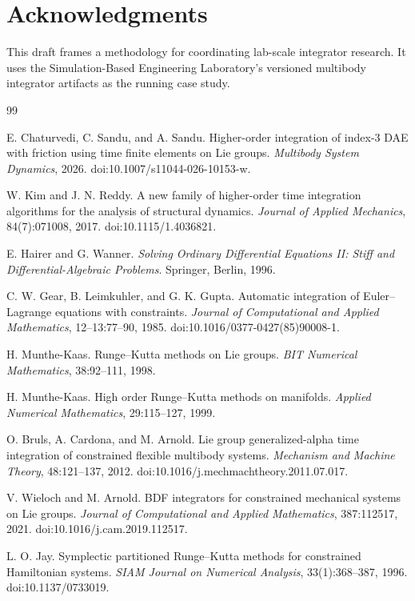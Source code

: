 \documentclass[10pt]{article}
\begin{document}
\section*{Acknowledgments}

This draft frames a methodology for coordinating lab-scale integrator
research. It uses the Simulation-Based Engineering Laboratory's versioned
multibody integrator artifacts as the running case study.

\begin{thebibliography}{99}

E. Chaturvedi, C. Sandu, and A. Sandu.
Higher-order integration of index-3 DAE with friction using time finite
elements on Lie groups.
\emph{Multibody System Dynamics}, 2026.
doi:10.1007/s11044-026-10153-w.

W. Kim and J. N. Reddy.
A new family of higher-order time integration algorithms for the analysis of
structural dynamics.
\emph{Journal of Applied Mechanics}, 84(7):071008, 2017.
doi:10.1115/1.4036821.

E. Hairer and G. Wanner.
\emph{Solving Ordinary Differential Equations II: Stiff and
Differential-Algebraic Problems}.
Springer, Berlin, 1996.

C. W. Gear, B. Leimkuhler, and G. K. Gupta.
Automatic integration of Euler--Lagrange equations with constraints.
\emph{Journal of Computational and Applied Mathematics}, 12--13:77--90, 1985.
doi:10.1016/0377-0427(85)90008-1.

H. Munthe-Kaas.
Runge--Kutta methods on Lie groups.
\emph{BIT Numerical Mathematics}, 38:92--111, 1998.

H. Munthe-Kaas.
High order Runge--Kutta methods on manifolds.
\emph{Applied Numerical Mathematics}, 29:115--127, 1999.

O. Bruls, A. Cardona, and M. Arnold.
Lie group generalized-alpha time integration of constrained flexible
multibody systems.
\emph{Mechanism and Machine Theory}, 48:121--137, 2012.
doi:10.1016/j.mechmachtheory.2011.07.017.

V. Wieloch and M. Arnold.
BDF integrators for constrained mechanical systems on Lie groups.
\emph{Journal of Computational and Applied Mathematics}, 387:112517, 2021.
doi:10.1016/j.cam.2019.112517.

L. O. Jay.
Symplectic partitioned Runge--Kutta methods for constrained Hamiltonian
systems.
\emph{SIAM Journal on Numerical Analysis}, 33(1):368--387, 1996.
doi:10.1137/0733019.


\end{thebibliography}
\end{document}
